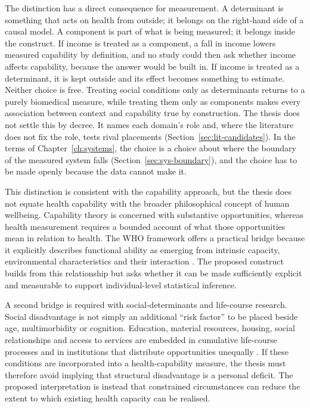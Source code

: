 The distinction has a direct consequence for measurement. A determinant is something that acts on health from outside; it belongs on the right-hand side of a causal model. A component is part of what is being measured; it belongs inside the construct. If income is treated as a component, a fall in income lowers measured capability by definition, and no study could then ask whether income affects capability, because the answer would be built in. If income is treated as a determinant, it is kept outside and its effect becomes something to estimate. Neither choice is free. Treating social conditions only as determinants returns to a purely biomedical measure, while treating them only as components makes every association between context and capability true by construction. The thesis does not settle this by decree. It names each domain's role and, where the literature does not fix the role, tests rival placements (Section~\ref{sec:lit-candidates}). In the terms of Chapter~\ref{ch:systems}, the choice is a choice about where the boundary of the measured system falls (Section~\ref{sec:sys-boundary}), and the choice has to be made openly because the data cannot make it.

This distinction is consistent with the capability approach, but the thesis does not equate health capability with the broader philosophical concept of human wellbeing. Capability theory is concerned with substantive opportunities, whereas health measurement requires a bounded account of what those opportunities mean in relation to health. The WHO framework offers a practical bridge because it explicitly describes functional ability as emerging from intrinsic capacity, environmental characteristics and their interaction \citep{who_2015_ageing}. The proposed construct builds from this relationship but asks whether it can be made sufficiently explicit and measurable to support individual-level statistical inference.

A second bridge is required with social-determinants and life-course research. Social disadvantage is not simply an additional ``risk factor'' to be placed beside age, multimorbidity or cognition. Education, material resources, housing, social relationships and access to services are embedded in cumulative life-course processes and in institutions that distribute opportunities unequally \citep{who_sdh_2008,marmot_2005}. If these conditions are incorporated into a health-capability measure, the thesis must therefore avoid implying that structural disadvantage is a personal deficit. The proposed interpretation is instead that constrained circumstances can reduce the extent to which existing health capacity can be realised.

